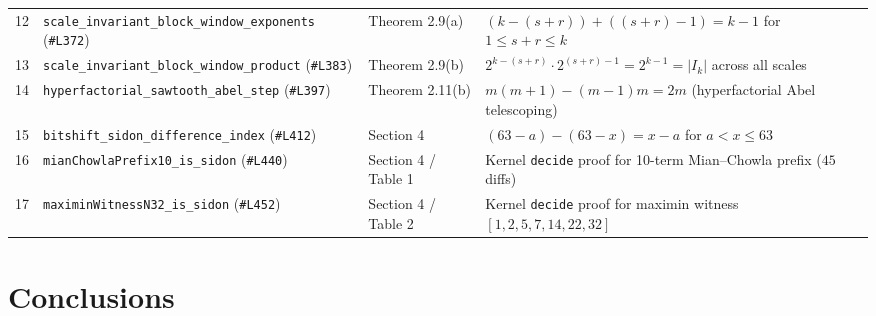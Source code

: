 \documentclass[11pt,reqno]{amsart}
\theoremstyle{definition}
\theoremstyle{remark}
\begin{document}
\begin{table}[htbp]
{\begin{tabular}{clll}
    12 & \texttt{scale\_invariant\_block\_window\_exponents} (\texttt{\#L372}) & Theorem 2.9(a) & $(k - (s + r)) + ((s + r) - 1) = k - 1$ for $1 \le s + r \le k$ \\
    13 & \texttt{scale\_invariant\_block\_window\_product} (\texttt{\#L383}) & Theorem 2.9(b) & $2^{k-(s+r)} \cdot 2^{(s+r)-1} = 2^{k-1} = |I_k|$ across all scales \\
    14 & \texttt{hyperfactorial\_sawtooth\_abel\_step} (\texttt{\#L397}) & Theorem 2.11(b) & $m(m + 1) - (m - 1)m = 2m$ (hyperfactorial Abel telescoping) \\
    15 & \texttt{bitshift\_sidon\_difference\_index} (\texttt{\#L412}) & Section 4 & $(63 - a) - (63 - x) = x - a$ for $a < x \le 63$ \\
    16 & \texttt{mianChowlaPrefix10\_is\_sidon} (\texttt{\#L440}) & Section 4 / Table 1 & Kernel \texttt{decide} proof for 10-term Mian--Chowla prefix ($45$ diffs) \\
    17 & \texttt{maximinWitnessN32\_is\_sidon} (\texttt{\#L452}) & Section 4 / Table 2 & Kernel \texttt{decide} proof for maximin witness $[1,2,5,7,14,22,32]$ \\
    \bottomrule
  \end{tabular}%
  }
\end{table}

\section{Conclusions}
\end{document}
